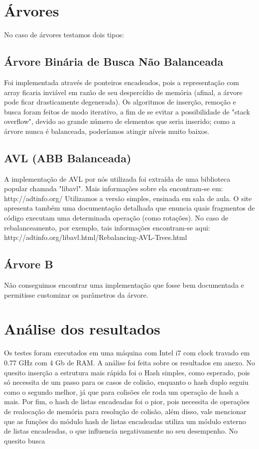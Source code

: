 \documentclass[twoside]{article}
\begin{document}
\begin{multicols}{2}


\section{Árvores}

No caso de árvores testamos dois tipos:
\subsection{ Árvore Binária de Busca Não Balanceada }
   Foi implementada através de ponteiros encadeados, pois a representação com array ficaria inviável em razão de seu despercídio de memória (afinal, a árvore pode ficar drasticamente degenerada). Os algoritmos de inserção, remoção e busca foram feitos de modo iterativo, a fim de se evitar a possibilidade de "stack overflow", devido ao grande número de elementos que seria inserido; como a árvore nunca é balanceada, poderíamos atingir níveis muito baixos.

\subsection{ AVL (ABB Balanceada) }
   A implementação de AVL por nós utilizada foi extraída de uma biblioteca popular chamada "libavl". Mais informações sobre ela encontram-se em: http://adtinfo.org/
   Utilizamos a versão simples, ensinada em sala de aula. O site apresenta também uma documentação detalhada que enuncia quais fragmentos de código executam uma determinada operação (como rotações). No caso de rebalanceamento, por exemplo, tais informações encontram-se aqui: 
   http://adtinfo.org/libavl.html/Rebalancing-AVL-Trees.html

\subsection{ Árvore B }
   Não conseguimos encontrar uma implementação que fosse bem documentada e permitisse customizar os parâmetros da árvore.


\section{Análise dos resultados}
	Os testes foram executados em uma máquina com Intel i7 com clock travado em 0.77 GHz com 4 Gb de RAM.
	A análise foi feita sobre os resultados em anexo.%
	No quesito inserção a estrutura mais rápida foi o Hash simples, como esperado, pois só necessita de um passo para os casos de colisão, enquanto o hash duplo seguiu como o segundo melhor, já que para colisões ele roda um operação de hash a mais. Por fim, o hash de listas encadeadas foi o pior, pois necessita de operações de realocação de memória para resolução de colisão, além disso, vale mencionar que as funções do módulo hash de listas encadeadas utiliza um módulo externo de listas encadeadas, o que influencia negativamente no seu desempenho.
	No quesito busca


\end{multicols}
\end{document}
